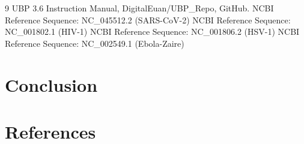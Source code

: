 \documentclass[11pt, a4paper]{article}
\begin{document}
\begin{thebibliography}{9}
UBP 3.6 Instruction Manual, DigitalEuan/UBP\_Repo, GitHub.
NCBI Reference Sequence: NC\_045512.2 (SARS-CoV-2)
NCBI Reference Sequence: NC\_001802.1 (HIV-1)
NCBI Reference Sequence: NC\_001806.2 (HSV-1)
NCBI Reference Sequence: NC\_002549.1 (Ebola-Zaire)
\end{thebibliography}

\section{Conclusion}

\section{References}
\end{document}
